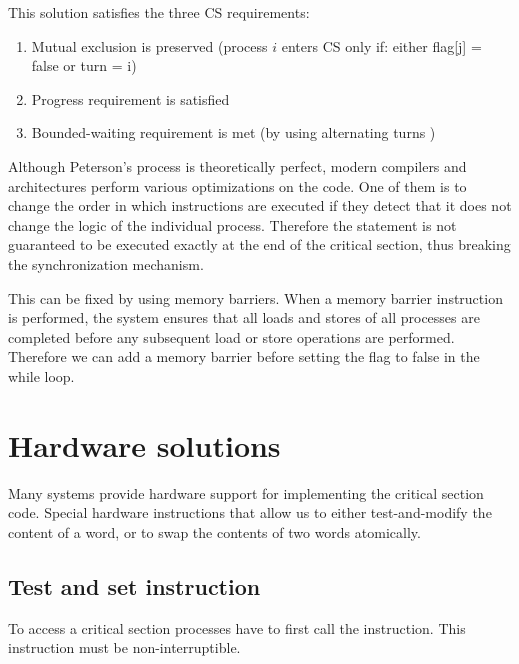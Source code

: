 This solution satisfies the three CS requirements:
\begin{enumerate}
    \item Mutual exclusion is preserved (process $i$ enters CS only if: either flag[j] = false or turn = i)
    \item Progress requirement is satisfied
    \item Bounded-waiting requirement is met (by using alternating turns )
\end{enumerate}

Although Peterson's process is theoretically perfect, modern compilers and architectures perform various optimizations on the code. One of them is to change the order in which instructions are executed if they detect that it does not change the logic of the individual process. Therefore the  statement is not guaranteed to be executed exactly at the end of the critical section, thus breaking the synchronization mechanism.

This can be fixed by using memory barriers. When a memory barrier instruction is performed, the system ensures that all loads and stores of all processes are completed before any subsequent load or store operations are performed. Therefore we can add a memory barrier before setting the flag to false in the while loop.

\section{Hardware solutions}
Many systems provide hardware support for implementing the critical section code. Special hardware instructions that allow us to either test-and-modify the content of a word, or to swap the contents of two words atomically.

\subsection{Test and set instruction}
To access a critical section processes have to first call the  instruction. This instruction must be non-interruptible.
